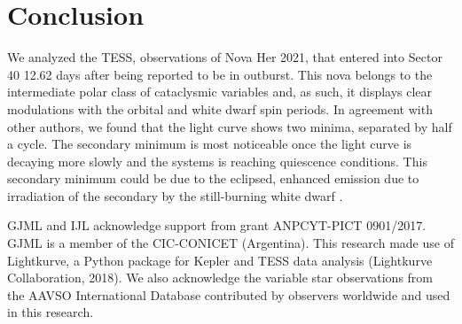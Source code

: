 \documentclass[baaa]{baaa}
\begin{document}

\section{Conclusion}
\label{sec:conc}

We analyzed the TESS, observations of Nova Her 2021, that entered into Sector 40 12.62 days after being reported to be in outburst. This nova belongs to the intermediate polar class of cataclysmic variables and, as such, it displays clear modulations with the orbital and white dwarf spin periods. In agreement with other authors, we found that the light curve shows two minima, separated by half a cycle. The secondary minimum is most noticeable once the light curve is decaying more slowly and the systems is reaching quiescence conditions. This secondary minimum could be due to the eclipsed, enhanced emission due to irradiation of the secondary by the still-burning white dwarf \citep{2022ApJ...924...27P}.

\begin{acknowledgement}

GJML and IJL acknowledge support from grant ANPCYT-PICT 0901/2017. GJML is a member of the CIC-CONICET (Argentina). This research made use of Lightkurve, a Python package for Kepler and TESS data analysis (Lightkurve Collaboration, 2018). We also acknowledge the variable star observations from the {\sc AAVSO} International Database contributed by observers worldwide and used in this research.

\end{acknowledgement}


\small
 
\end{document}
